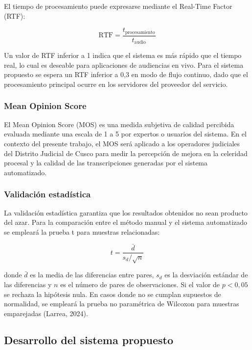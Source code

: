 \documentclass[12pt,a4paper,oneside]{article}
\begin{document}
El tiempo de procesamiento puede expresarse mediante el Real-Time Factor (RTF):

\begin{equation}
\text{RTF} = \frac{t_{\text{procesamiento}}}{t_{\text{audio}}}
\end{equation}

Un valor de RTF inferior a 1 indica que el sistema es m\'as r\'apido que el tiempo real, lo cual es deseable para aplicaciones de audiencias en vivo. Para el sistema propuesto se espera un RTF inferior a 0{,}3 en modo de flujo continuo, dado que el procesamiento principal ocurre en los servidores del proveedor del servicio.

\subsubsection{Mean Opinion Score}

El Mean Opinion Score (MOS) es una medida subjetiva de calidad percibida evaluada mediante una escala de 1 a 5 por expertos o usuarios del sistema. En el contexto del presente trabajo, el MOS ser\'a aplicado a los operadores judiciales del Distrito Judicial de Cusco para medir la percepci\'on de mejora en la celeridad procesal y la calidad de las transcripciones generadas por el sistema automatizado.

\subsubsection{Validaci\'on estad\'istica}

La validaci\'on estad\'istica garantiza que los resultados obtenidos no sean producto del azar. Para la comparaci\'on entre el m\'etodo manual y el sistema automatizado se emplear\'a la prueba t para muestras relacionadas:

\begin{equation}
t = \frac{\bar{d}}{s_d / \sqrt{n}}
\end{equation}

donde $\bar{d}$ es la media de las diferencias entre pares, $s_d$ es la desviaci\'on est\'andar de las diferencias y $n$ es el n\'umero de pares de observaciones. Si el valor de $p < 0{,}05$ se rechaza la hip\'otesis nula. En casos donde no se cumplan supuestos de normalidad, se emplear\'a la prueba no param\'etrica de Wilcoxon para muestras emparejadas (Larrea, 2024).

\subsection{Desarrollo del sistema propuesto}
\end{document}
